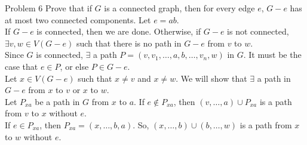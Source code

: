 \documentclass[8pt]{extarticle}
\begin{document}
  \begin{problem}{Problem 6}
    Prove that if $G$ is a connected graph, then for every edge $e$, $G-e$ has at most two connected components.
    \tcblower
    Let $e = ab$.\\

    If $G-e$ is connected, then we are done. Otherwise, if $G-e$ is not connected, $\exists v,w\in V(G-e)$ such that there is no path in $G-e$ from $v$ to $w$.\\

    Since $G$ is connected, $\exists$ a path $P = (v,v_1,\dots,a,b,\dots,v_n,w)$ in $G$. It must be the case that $e\in P$, or else $P\in G-e$.\\

    Let $x\in V(G-e)$ such that $x\neq v$ and $x\neq w$. We will show that $\exists$ a path in $G-e$ from $x$ to $v$ or $x$ to $w$.\\

    Let $P_{xa}$ be a path in $G$ from $x$ to $a$. If $e\notin P_{xa}$, then $(v,\dots,a) \cup P_{xa}$ is a path from $v$ to $x$ without $e$.\\

    If $e\in P_{xa}$, then $P_{xa} = (x,\dots,b,a)$. So, $(x,\dots,b) \cup (b,\dots,w)$ is a path from $x$ to $w$ without $e$.
  \end{problem}
\end{document}
